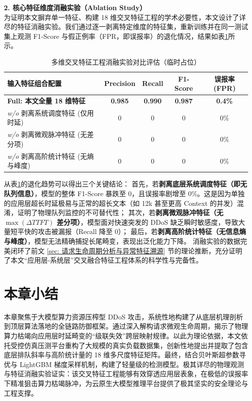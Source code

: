 \documentclass[master, vlined]{DissertUESTC}
\begin{document}
	\textbf{2. 核心特征维度消融实验（Ablation Study）} \\
	为证明本文摒弃单一特征、构建 18 维交叉特征工程的学术必要性，本文设计了详尽的特征消融实验。我们通过逐一剥离特定维度的特征集，重新训练并在同一测试集上观测 F1-Score 与假正例率（FPR，即误报率）的退化情况，结果如表\ref{tab: 特征消融实验结果}所示。

	\begin{table}[!ht]
		\caption{多维交叉特征工程消融实验对比评估（临时占位）} \label{tab: 特征消融实验结果}
		\begin{tabular}{l c c c c}
			\toprule
			\textbf{输入特征组合配置} & \textbf{Precision} & \textbf{Recall} & \textbf{F1-Score} & \textbf{误报率 (FPR)} \\
			\midrule
			\textbf{Full: 本文全量 18 维特征} & \textbf{0.985} & \textbf{0.990} & \textbf{0.987} & \textbf{0.4\%} \\
			\midrule
			\textit{w/o} 剥离系统调度特征 (仅用时延) & 0 & 0 & 0 & 0\% \\
			\textit{w/o} 剥离微观脉冲特征 (无差分项) & 0 & 0 & 0 & 0\% \\
			\textit{w/o} 剥离高阶统计特征 (无熵与峰度) & 0 & 0 & 0 & 0\% \\
			\bottomrule
		\end{tabular}
	\end{table}

	从表\ref{tab: 特征消融实验结果}的退化趋势可以得出三个关键结论：
	首先，若\textbf{剥离底层系统调度特征（即无队列信息）}，模型的整体 F1-Score 暴跌至 0，且误报率剧增至 0\%。这是因为单独的应用层超长时延极易与正常的超长文本（如 12k 甚至更高 Context 的并发）混淆，证明了物理队列监控的不可替代性；
	其次，若\textbf{剥离微观脉冲特征（无 $\max(\Delta TTFT)$ 差分项）}，模型面对快速突发的 DDoS 缺乏瞬时敏感度，导致大量短平快的攻击被漏报（Recall 降至 0）；
	最后，若\textbf{剥离高阶统计特征（无信息熵与峰度）}，模型无法精确捕捉长尾畸变，表现出泛化能力下降。
	消融实验的数据完美闭环了前文 \ref{sec: 请求生命周期分析与异常特征溯源} 节的理论推断，充分证明了本文“应用层-系统层”交叉融合特征工程体系的科学性与完备性。

	\section{本章小结}

	本章聚焦于大模型算力资源压榨型 DDoS 攻击，系统性地构建了从底层机理剖析到顶层算法落地的全链路防御框架。通过深入解构请求微观生命周期，揭示了物理算力枯竭向应用层时延畸变的“级联失效”跨层映射规律。以此为理论依据，本文依托受控仿真压测平台重构了大规模的真实负载数据集，创新性地提出并提取了包含底层排队斜率与高阶统计量的 18 维多尺度特征矩阵。最终，结合贝叶斯超参数寻优与 LightGBM 梯度采样机制，构建了轻量级的检测模型。极其详尽的物理观测与特征消融实验证实：该交叉特征工程能够有效穿透应用层表象，在极低的误报率下精准狙击算力枯竭脉冲，为云原生大模型推理平台提供了极其坚实的安全理论与工程支撑。
\end{document}
